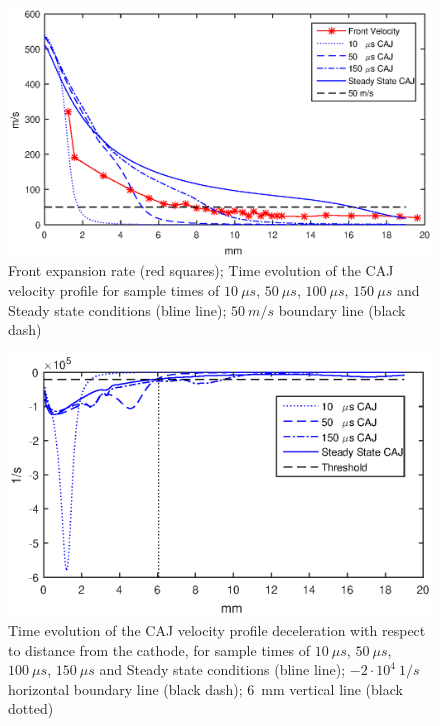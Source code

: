 \documentclass[a4paper]{iacas}%
\begin{document}
\begin{figure}
	\includegraphics[width=\textwidth]{Vel_Times.eps}
	\caption{Front expansion rate (red squares); Time evolution of the CAJ velocity profile for sample times of $10~\mu s$, $50~\mu s$, $100~\mu s$, $150~\mu s$ and Steady state conditions (bline line); $50~m/s$ boundary line (black dash) }
	\label{fig:model_caj_velocity}
\end{figure}

\begin{figure}
	\includegraphics[width=\textwidth]{CAJAcceleration.eps}
	\caption{Time evolution of the CAJ velocity profile deceleration with respect to distance from the cathode, for sample times of $10~\mu s$, $50~\mu s$, $100~\mu s$, $150~\mu s$ and Steady state conditions (bline line); $-2\cdot 10^4~1/s$ horizontal boundary line (black dash); 6~mm vertical line (black dotted) }
	\label{fig:model_caj_acceleration}
\end{figure}
\end{document}
